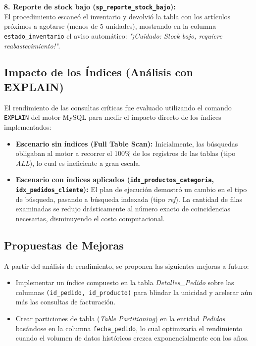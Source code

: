 \documentclass[11pt,a4paper]{article}
\begin{document}
\textbf{8. Reporte de stock bajo (\texttt{sp\_reporte\_stock\_bajo}):} \\
El procedimiento escaneó el inventario y devolvió la tabla con los artículos próximos a agotarse (menos de 5 unidades), mostrando en la columna \texttt{estado\_inventario} el aviso automático: \textit{"¡Cuidado: Stock bajo, requiere reabastecimiento!"}.

\subsection{Impacto de los Índices (Análisis con EXPLAIN)}
El rendimiento de las consultas críticas fue evaluado utilizando el comando \texttt{EXPLAIN} del motor MySQL para medir el impacto directo de los índices implementados:
\begin{itemize}
    \item \textbf{Escenario sin índices (Full Table Scan):} Inicialmente, las búsquedas obligaban al motor a recorrer el 100\% de los registros de las tablas (tipo \textit{ALL}), lo cual es ineficiente a gran escala.
    \item \textbf{Escenario con índices aplicados (\texttt{idx\_productos\_categoria}, \texttt{idx\_pedidos\_cliente}):} El plan de ejecución demostró un cambio en el tipo de búsqueda, pasando a búsqueda indexada (tipo \textit{ref}). La cantidad de filas examinadas se redujo drásticamente al número exacto de coincidencias necesarias, disminuyendo el costo computacional.
\end{itemize}

\subsection{Propuestas de Mejoras}
A partir del análisis de rendimiento, se proponen las siguientes mejoras a futuro:
\begin{itemize}
    \item Implementar un índice compuesto en la tabla \textit{Detalles\_Pedido} sobre las columnas \texttt{(id\_pedido, id\_producto)} para blindar la unicidad y acelerar aún más las consultas de facturación.
    \item Crear particiones de tabla (\textit{Table Partitioning}) en la entidad \textit{Pedidos} basándose en la columna \texttt{fecha\_pedido}, lo cual optimizaría el rendimiento cuando el volumen de datos históricos crezca exponencialmente con los años.
\end{itemize}
\end{document}
